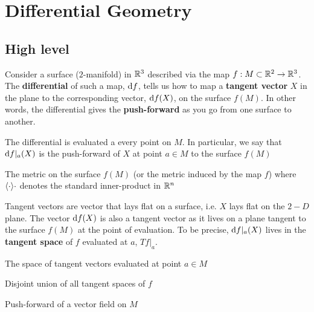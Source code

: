 \section{Differential Geometry}

\subsection{High level}

\begin{definition}[Differential $\d f$]
    Consider a surface ($2$-manifold) in $\mathbb{R}^3$ described via the map $f: M\subset\mathbb{R}^2 \to \mathbb{R}^3$. The \textbf{differential} of such a map, $\d f$, tells us how to map a \textbf{tangent vector} $X$ in the plane to the corresponding vector, $\mathrm{d} f(X)$, on the surface $f(M)$. In other words, the differential gives the \textbf{push-forward} as you go from one surface to another.
    
    The differential is evaluated a every point on $M$. In particular, we say that $\mathrm{d} f|_a(X)$ is the push-forward of $X$ at point $a\in M$ to the surface $f(M)$
\end{definition}
\begin{definition}[Metric]
    The metric on the surface $f(M)$ (or the metric induced by the map $f$)
    where $\langle \cdot \rangle{\cdot}$ denotes the standard inner-product in $\mathbb{R}^n$
\end{definition}

\begin{definition}
    Tangent vectors are vector that lays flat on a surface, i.e. $X$ lays flat on the $2-D$ plane. The vector $\mathrm{d} f(X)$ is also a tangent vector as it lives on a plane tangent to the surface $f(M)$ at the point of evaluation. To be precise, $\mathrm{d} f|_a(X)$ lives in the \textbf{tangent space} of $f$ evaluated at $a$, $Tf|_a$.
\end{definition}
\begin{definition}
    The space of tangent vectors evaluated at point $a\in M$
\end{definition}
\begin{definition}
    Disjoint union of all tangent spaces of $f$
\end{definition}

\begin{definition}
    Push-forward of a vector field on $M$
\end{definition}

